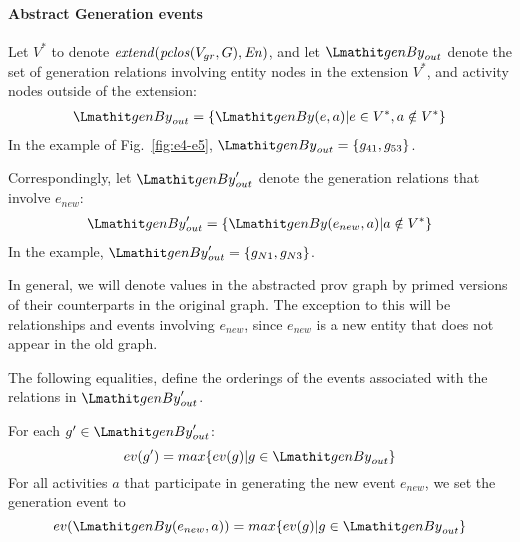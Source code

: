 \paragraph*{\textbf{Abstract Generation events}}
Let $V^*$ to denote $\mathit{extend}(\mathit{pclos}(V_{gr},G), \mathit{En})$, and let $\wgby_{out}$ denote the set of generation relations involving entity nodes in the extension
$V^*$, and activity nodes outside of the extension:
\begin{align*} 
\wgby_{out} = \{ \wgby(e,a) |  e \in V^*,  a \notin V^* \}
\end{align*} 
In the example of Fig.~\ref{fig:e4-e5}, $\wgby_{out} = \{ g_{41}, g_{53} \}$.

%
Correspondingly, let $\wgby'_{out}$ denote the generation relations that involve $e_{new}$:
\begin{align*} 
\wgby'_{out} = \{ \wgby(e_{new},a) | a \notin V^* \}
\end{align*} 
In the example, $\wgby'_{out} = \{ g_{N1}, g_{N3} \}$.

In general, we will denote values in the abstracted prov graph by primed versions of their counterparts in the original graph. The exception to this will be relationships and events involving $e_{new}$, since $e_{new}$ is  a new entity that does not appear in the old graph.

The following equalities, define the orderings of the events associated with the relations in $\wgby'_{out}$.

\vspace*{10pt}
\begin{definition}
\label{def:abstract-gen-e}
For each $g' \in \wgby'_{out}$:
\[
ev(g') = max \{ ev(g) | g \in \wgby_{out} \}  
\]
For all activities $a$ that participate in generating the new event $e_{new}$, we set the generation event to
\[
ev(\wgby(e_{new},a)) = max \{ ev(g) | g \in \wgby_{out} \}
\]
\end{definition}


